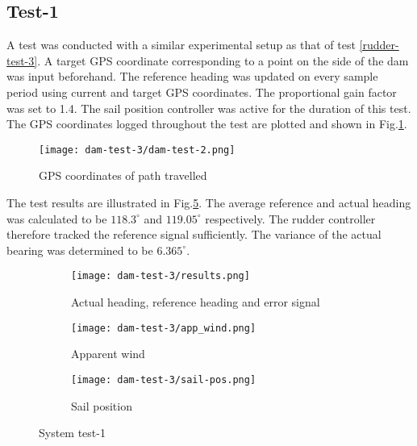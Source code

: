 \subsection{Test-1}
\label{system-test-1}

A test was conducted with a similar experimental setup as that of test \ref{rudder-test-3}. A target GPS coordinate corresponding to a point on the side of the dam was input beforehand. The reference
heading was updated on every sample period using current and target GPS coordinates. The proportional gain factor was set to 1.4. The sail position controller was active for the duration of this 
test. The GPS coordinates logged throughout the test are plotted and shown in Fig.\ref{fig:system-test-1-path}.

\begin{figure}[h!]
    \centering
    \texttt{[image: dam-test-3/dam-test-2.png]}
    \caption[Path travelled in first system test]{GPS coordinates of path travelled}
    \label{fig:system-test-1-path}
\end{figure}

The test results are illustrated in Fig.\ref{fig:system-1-water}. The average reference and actual heading was calculated to be $118.3^{\circ}$ and $119.05^{\circ}$ respectively. The rudder controller 
therefore tracked the reference signal sufficiently. The variance of the actual bearing was determined to be $6.365^{\circ}$. 

\begin{figure}[h!]
    \centering
    \begin{subfigure}{=0.75\linewidth}
        \centering
        \texttt{[image: dam-test-3/results.png]}
        \caption{Actual heading, reference heading and error signal}
        \label{subfig:system-1-heading}
    \end{subfigure}

    \begin{subfigure}{=0.75\linewidth}
        \centering
        \texttt{[image: dam-test-3/app\_wind.png]}
        \caption{Apparent wind}
        \label{subfig:system-1-wind}
    \end{subfigure}

    \begin{subfigure}{=0.75\linewidth}
        \centering
        \texttt{[image: dam-test-3/sail-pos.png]}
        \caption{Sail position}
        \label{subfig:system-1-sail}
    \end{subfigure}

    \caption[System test-1]{System test-1}
    \label{fig:system-1-water}
\end{figure}

